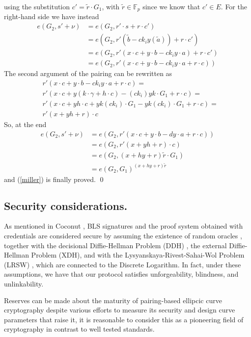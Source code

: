 \documentclass[twocolumn]{article}
\begin{document}
using the substitution $c'=\tilde{r}\cdot G_1$, with $\tilde{r}\in\mathbb{F}_p$ since we know that $c'\in E$. For the right-hand side we have instead
\begin{align*}
    e(G_2, s' + \nu) &= e(G_2, r'\cdot s + r \cdot c') \\
    &= e(G_2, r'(\tilde{b} - ck_i y (\tilde{a})) + r \cdot c') \\
    &= e(G_2, r'(x\cdot c + y\cdot b - ck_i y\cdot a) + r \cdot c') \\
    &= e(G_2, r'(x\cdot c + y\cdot b - ck_i y\cdot a + r \cdot c)) 
\end{align*}
The second argument of the pairing can be rewritten as
\[
\begin{split}
    &r'(x\cdot c + y\cdot b - ck_i y\cdot a + r \cdot c) = \\
    &r'(x\cdot c + y(k\cdot \gamma + h\cdot c) - (ck_i) yk\cdot G_1 + r \cdot c) = \\
    &r'(x\cdot c + yh\cdot c + yk(ck_i)\cdot G_1  - yk(ck_i)\cdot G_1 + r \cdot c) = \\
    &r'(x + yh + r) \cdot c
\end{split}
\]
So, at the end
\[
\begin{split}
    e(G_2, s' + \nu) &= e(G_2, r'(x\cdot c + y\cdot b - dy\cdot a + r \cdot c)) \\
    &= e(G_2, r'(x + yh + r) \cdot c) \\
    &= e(G_2,(x+hy+r)\tilde{r}\cdot G_1) \\
    &= e(G_2,G_1)^{(x+hy+r)\tilde{r}}
\end{split}
\]
and (\ref{miller}) is finally proved. 
\qed

\subsection*{Security considerations.} 

As mentioned in Coconut \citep{coconut-2018}, BLS signatures and the
proof system obtained with credentials are considered secure by assuming
the existence of random oracles \citep{random-oracle}, together with the
decisional Diffie-Hellman Problem (DDH) \citep{DDH-problem}, the
external Diffie-Hellman Problem (XDH), and with the
Lysyanskaya-Rivest-Sahai-Wol Problem (LRSW) \citep{lrsw-assumption},
which are connected to the Discrete Logarithm. In fact, under these
assumptions, we have that our protocol satisfies unforgeability,
blindness, and unlinkability.

Reserves can be made about the maturity of pairing-based ellipcic
curve cryptography despite various efforts to measure its security and
design curve parameters that raise it, it is reasonable to consider
this as a pioneering field of cryptography in contrast to well tested
standards.
\end{document}
